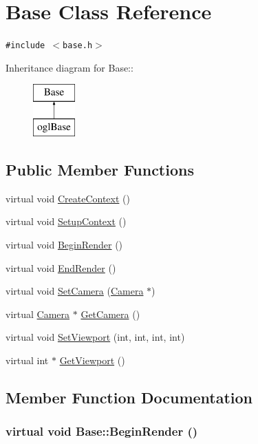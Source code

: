 \hypertarget{class_base}{
\section{Base Class Reference}
\label{class_base}
}
{\tt \#include $<$base.h$>$}

Inheritance diagram for Base::\begin{figure}[H]
\begin{center}
\leavevmode
\includegraphics[height=2cm]{class_base}
\end{center}
\end{figure}
\subsection*{Public Member Functions}
\begin{CompactItemize}
\item 
virtual void \hyperlink{class_base_72b306f2a2396b1520c036eae6e5054e}{CreateContext} ()
\item 
virtual void \hyperlink{class_base_71edd753368b895321786bd11a9784df}{SetupContext} ()
\item 
virtual void \hyperlink{class_base_f724516dec5bd0ebf330ac4697a4992e}{BeginRender} ()
\item 
virtual void \hyperlink{class_base_18136e695927486c0487eb9224911162}{EndRender} ()
\item 
virtual void \hyperlink{class_base_3502b98c0b0a3a8c4e4dc34fad149087}{SetCamera} (\hyperlink{class_camera}{Camera} $\ast$)
\item 
virtual \hyperlink{class_camera}{Camera} $\ast$ \hyperlink{class_base_1e6c50833404c9b10a4e4451e035fe73}{GetCamera} ()
\item 
virtual void \hyperlink{class_base_1716db3ad36a8cbb807c9096899b7264}{SetViewport} (int, int, int, int)
\item 
virtual int $\ast$ \hyperlink{class_base_78a8e2e08b7c6ecbe164c49630aabd4e}{GetViewport} ()
\end{CompactItemize}


\subsection{Member Function Documentation}
\hypertarget{class_base_f724516dec5bd0ebf330ac4697a4992e}{
\subsubsection[{BeginRender}]{\setlength{\rightskip}{0pt plus 5cm}virtual void Base::BeginRender ()}}
\label{class_base_f724516dec5bd0ebf330ac4697a4992e}




